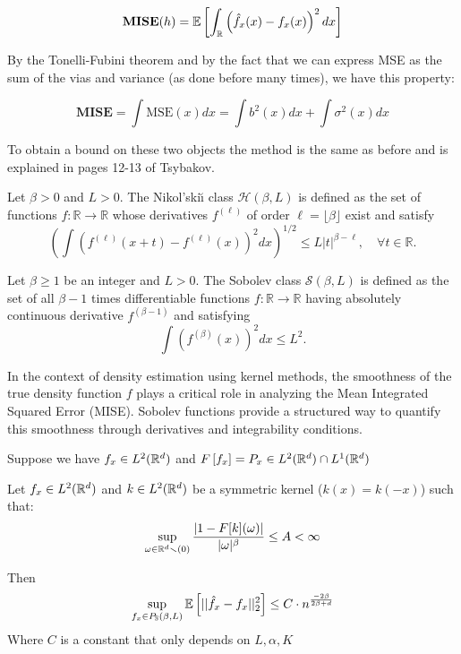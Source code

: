 \documentclass{article}
\begin{document}
\[
\textbf{MISE}(h)=\mathbb{E} \left[\int_{\mathbb{R}}\left(\hat{f}_{x}(x) - f_{x}(x)\right)^{2}dx\right]
\]

By the Tonelli-Fubini theorem and by the fact that we can express MSE as the sum of the vias and variance (as done before many times), we have this property:

\[
\textbf{MISE}=\int\text{MSE}(x)dx= \int b^{2}(x)dx + \int \sigma^{2}(x)dx
\]

To obtain a bound on these two objects the method is the same as before and is explained in pages 12-13 of Tsybakov. 


\begin{definition}
    Let $\beta > 0$ and $L > 0$. The Nikol'ski\u{\i} class $\mathcal{H}(\beta, L)$ is defined as the set of functions $f : \mathbb{R} \to \mathbb{R}$ whose derivatives $f^{(\ell)}$ of order $\ell = \lfloor \beta \rfloor$ exist and satisfy
    \[
    \left( \int \left( f^{(\ell)}(x + t) - f^{(\ell)}(x) \right)^2 dx \right)^{1/2} \leq L |t|^{\beta - \ell}, \quad \forall t \in \mathbb{R}.
    \]
    \end{definition}
    
    \begin{definition}
    Let $\beta \geq 1$ be an integer and $L > 0$. The Sobolev class $\mathcal{S}(\beta, L)$ is defined as the set of all $\beta - 1$ times differentiable functions $f : \mathbb{R} \to \mathbb{R}$ having absolutely continuous derivative $f^{(\beta-1)}$ and satisfying
    \[
    \int \left( f^{(\beta)}(x) \right)^2 dx \leq L^2.
    \]
    \end{definition}
    
   In the context of density estimation using kernel methods, the smoothness of the true density function $f$ plays a critical role in analyzing the Mean Integrated Squared Error (MISE). Sobolev functions provide a structured way to quantify this smoothness through derivatives and integrability conditions.

\begin{example}
    Suppose we have \(f_x \in L^{2}(\mathbb{R}^{d})\) and \(F\left[f_x\right]=P_x \in L^{2}(\mathbb{R}^{d}) \cap L^{1}(\mathbb{R}^{d}) \)
\end{example}


\begin{theorem}
    Let \(f_x \in L^{2}(\mathbb{R}^{d})\) and \(k\in L^{2}(\mathbb{R}^{d})\) be a symmetric kernel (\(k(x)=k(-x)\)) such that: 
    \[
    \sup_{\omega \in \mathbb{R}^{d}\smallsetminus(0)} \frac{|1-F[k](\omega)|}{|\omega|^{\beta}} \leq A < \infty
    \]

    Then \[
        \sup_{f_x \in P_{\mathbb{S}}(\beta, L)} \mathbb{E} \left[||\hat{f}_x - f_x||^{2}_{2}\right] \leq C \cdot n^{\frac{-2\beta}{2\beta + d}} 
    \]
    Where $C$ is a constant that only depends on $L, \alpha, K$
\end{theorem}
\end{document}
